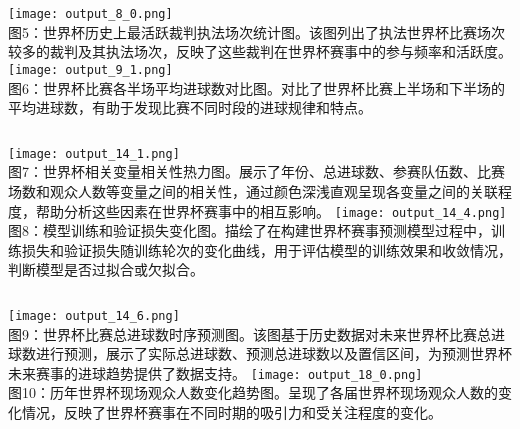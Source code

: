 \documentclass{beamer}
\begin{document}
	\begin{frame}
		\begin{columns}
			\centering
			\texttt{[image: output\_8\_0.png]} \\
			\small 图5：世界杯历史上最活跃裁判执法场次统计图。该图列出了执法世界杯比赛场次较多的裁判及其执法场次，反映了这些裁判在世界杯赛事中的参与频率和活跃度。
			\centering
			\texttt{[image: output\_9\_1.png]} \\
			\small 图6：世界杯比赛各半场平均进球数对比图。对比了世界杯比赛上半场和下半场的平均进球数，有助于发现比赛不同时段的进球规律和特点。
		\end{columns}
	\end{frame}
	
	\begin{frame}
		\begin{columns}
			\column{0.5\textwidth}
			\centering
			\texttt{[image: output\_14\_1.png]} \\
			\small 图7：世界杯相关变量相关性热力图。展示了年份、总进球数、参赛队伍数、比赛场数和观众人数等变量之间的相关性，通过颜色深浅直观呈现各变量之间的关联程度，帮助分析这些因素在世界杯赛事中的相互影响。
			\column{0.5\textwidth}
			\centering
			\texttt{[image: output\_14\_4.png]} \\
			\small 图8：模型训练和验证损失变化图。描绘了在构建世界杯赛事预测模型过程中，训练损失和验证损失随训练轮次的变化曲线，用于评估模型的训练效果和收敛情况，判断模型是否过拟合或欠拟合。
		\end{columns}
	\end{frame}
	
	\begin{frame}
		\begin{columns}
			\column{0.5\textwidth}
			\centering
			\texttt{[image: output\_14\_6.png]} \\
			\small 图9：世界杯比赛总进球数时序预测图。该图基于历史数据对未来世界杯比赛总进球数进行预测，展示了实际总进球数、预测总进球数以及置信区间，为预测世界杯未来赛事的进球趋势提供了数据支持。
			\column{0.5\textwidth}
			\centering
			\texttt{[image: output\_18\_0.png]} \\
			\small 图10：历年世界杯现场观众人数变化趋势图。呈现了各届世界杯现场观众人数的变化情况，反映了世界杯赛事在不同时期的吸引力和受关注程度的变化。
		\end{columns}
	\end{frame}
	
\end{document}
